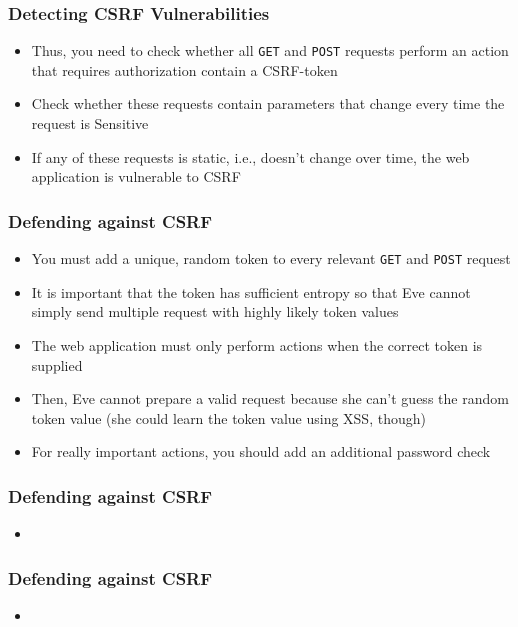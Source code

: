 \begin{frame}
    \frametitle{Detecting CSRF Vulnerabilities}
    \begin{itemize}
        \item Thus, you need to check whether all \texttt{GET} and \texttt{POST} requests perform an action that requires authorization contain a CSRF-token  
        \item Check whether these requests contain parameters that change every time the request is Sensitive
        \item If any of these requests is static, i.e., doesn't change over time, the web application is vulnerable to CSRF
    \end{itemize}
\end{frame}

\begin{frame}
    \frametitle{Defending against CSRF}
    \begin{itemize}
        \item You must add a unique, random token to every relevant \texttt{GET} and \texttt{POST} request
        \item It is important that the token has sufficient entropy so that Eve cannot simply send multiple request with highly likely token values
        \item The web application must only perform actions when the correct token is supplied
        \item Then, Eve cannot prepare a valid request because she can't guess the random token value (she could learn the token value using XSS, though) 
        \item For really important actions, you should add an additional password check
    \end{itemize}
\end{frame}

\begin{frame}
    \frametitle{Defending against CSRF}
    \begin{itemize}
        \item 
    \end{itemize}
\end{frame}

\begin{frame}
    \frametitle{Defending against CSRF}
    \begin{itemize}
        \item 
    \end{itemize}
\end{frame}